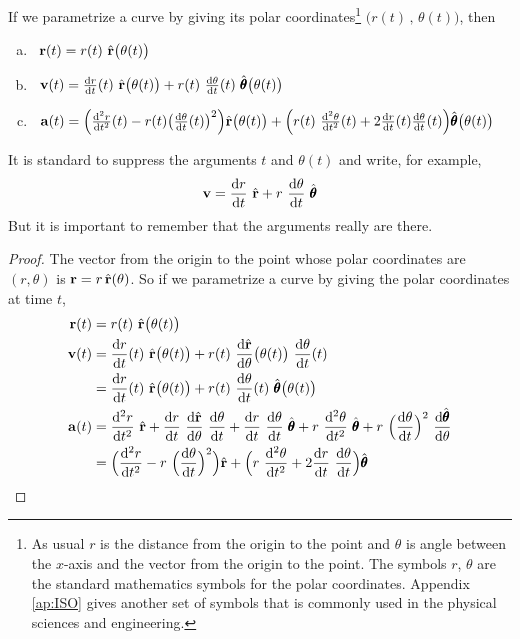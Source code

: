\begin{lemma}\label{lem:polar}
If we parametrize a curve by giving its polar coordinates\footnote{As usual $r$ is the distance from the origin to the point and $\theta$ is angle between the $x$-axis and the vector from the origin to the point. The symbols $r$, $\theta$
are the standard mathematics symbols for the polar coordinates. Appendix \ref{ap:ISO} gives another set of symbols that is commonly used in the physical sciences and engineering.} $\big(r(t)\,,\,\theta(t)\big)$, then
\begin{enumerate}[(a)]
\item
\  $\mathbf{r}(t) = r(t)\ \hat{\mathbf{r}}\big(\theta(t)\big)$
\item
\  $\vv(t) = \diff{r}{t}(t)\ \hat\vr\big(\theta(t)\big) 
             + r(t)\ \diff{\theta}{t}(t)\ \hat\vth\big(\theta(t)\big)$
\item
\  $\va(t) = 
\Big(\difftwo{r}{t}(t)-r(t)\big(\diff{\theta}{t}(t)\big)^2\Big) 
             \hat\vr\big(\theta(t)\big)
   +\Big(r(t)\ \difftwo{\theta}{t}(t) 
          + 2 \diff{r}{t}(t)\diff{\theta}{t}(t)\Big)
                  \hat\vth\big(\theta(t)\big)$
\end{enumerate}
\end{lemma}
\noindent It is standard to suppress the arguments $t$ and $\theta(t)$
and write, for example,
\begin{equation*}
\vv= \diff{r}{t}\ \hat\vr
             + r\ \diff{\theta}{t}\ \hat\vth
\end{equation*}
But it is important to remember that the arguments really are there.
\begin{proof}

The vector from the origin to the point whose 
polar coordinates are 
$(r,\theta)$ is $\mathbf{r} = r\,\hat{\mathbf{r}}(\theta)$. So if we parametrize a curve by 
giving the polar coordinates at time $t$,
\begin{align*}
\vr(t) &= r(t)\ \hat\vr\big(\theta(t)\big)
 \\
\vv(t) &= \diff{r}{t}(t)\ \hat\vr\big(\theta(t)\big) +
              r(t)\ \diff{\hat\vr}{\theta}\big(\theta(t)\big)\ 
              \diff{\theta}{t}(t) \notag\\
        &= \diff{r}{t}(t)\ \hat\vr\big(\theta(t)\big) 
             + r(t)\ \diff{\theta}{t}(t)\ \hat\vth\big(\theta(t)\big)
\\
\va(t) & = \difftwo{r}{t}\ \hat\vr 
                + \diff{r}{t}\ \diff{\hat\vr}{\theta}\ \diff{\theta}{t} 
             + \diff{r}{t}\ \diff{\theta}{t}\ \hat\vth
             + r\ \difftwo{\theta}{t}\ \hat\vth
             + r\ \Big(\diff{\theta}{t}\Big)^2\ \diff{\hat\vth}{\theta} 
\\
       &=\Big(\difftwo{r}{t}-r\ \Big(\diff{\theta}{t}\Big)^2\Big) \hat\vr
   +\Big(r\ \difftwo{\theta}{t} + 2 \diff{r}{t}\ \diff{\theta}{t}\Big)\hat\vth
\end{align*}
\end{proof}

